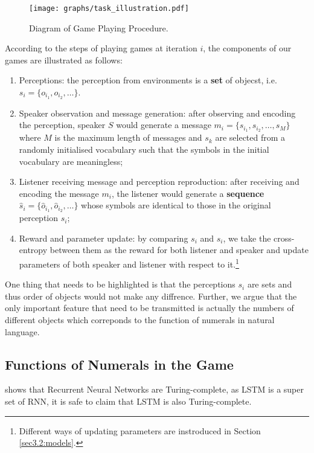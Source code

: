 \begin{figure}[!h]
  \centering
  \texttt{[image: graphs/task\_illustration.pdf]}
  \caption{Diagram of Game Playing Procedure.}
  \label{fig2:game_procedure}
\end{figure}

According to the steps of playing games at iteration $i$, the components of our games are illustrated as follows:
\begin{enumerate}
  \item Perceptions: the perception from environments is a \textbf{set} of objecst, i.e. $s_i=\{o_{i_1}, o_{i_2}, \dots\}$.
  \item Speaker observation and message generation: after observing and encoding the perception, speaker $S$ would generate a message $m_i=\{s_{i_1}, s_{i_2}, \dots, s_{M}\}$ where $M$ is the maximum length of messages and $s_k$ are selected from a randomly initialised vocabulary such that the symbols in the initial vocabulary are meaningless;
  \item Listener receiving message and perception reproduction: after receiving and encoding the message $m_i$, the listener would generate a \textbf{sequence} $\hat{s}_i = \{\hat{o}_{i_1}, \hat{o}_{i_2}, \dots\}$ whose symbols are identical to those in the original perception $s_i$;
  \item Reward and parameter update: by comparing $s_i$ and $\hat{s}_i$, we take the cross-entropy between them as the reward for both listener and speaker and update parameters of both speaker and listener with respect to it.\footnote{Different ways of updating parameters are instroduced in Section \ref{sec3.2:models}.}
\end{enumerate}

One thing that needs to be highlighted is that the perceptions $s_i$ are sets and thus order of objects would not make any diffrence. Further, we argue that the only important feature that need to be transmitted is actually the numbers of different objects which correponds to the function of numerals in natural language.

\subsection{Functions of Numerals in the Game}
\label{ssec3.1.2:numeral_in_game}

\cite{Siegelmann1992NN} shows that Recurrent Neural Networks are Turing-complete, as LSTM is a super set of RNN, it is safe to claim that LSTM is also Turing-complete.

